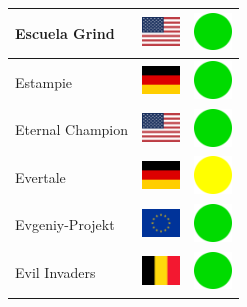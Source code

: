 \documentclass[12pt, a4paper, twoside]{report}
\begin{document}
\begin{center}
\begin{longtable}{|p{5cm}|p{2cm}|p{2cm}|}
 Escuela Grind                                              & \includegraphics[width=1cm]{../4x3/us} &   \includegraphics[width=1cm]{../likes/y} \\ \hline
 Estampie                                                   & \includegraphics[width=1cm]{../4x3/de} &   \includegraphics[width=1cm]{../likes/y} \\ \hline
 Eternal Champion                                           & \includegraphics[width=1cm]{../4x3/us} &   \includegraphics[width=1cm]{../likes/y} \\ \hline
 Evertale                                                   & \includegraphics[width=1cm]{../4x3/de} &   \includegraphics[width=1cm]{../likes/m} \\ \hline
 Evgeniy-Projekt                                            & \includegraphics[width=1cm]{../4x3/eu} &   \includegraphics[width=1cm]{../likes/y} \\ \hline
 Evil Invaders                                              & \includegraphics[width=1cm]{../4x3/be} &   \includegraphics[width=1cm]{../likes/y} \\ \hline

\end{longtable}
\end{center}
\end{document}
